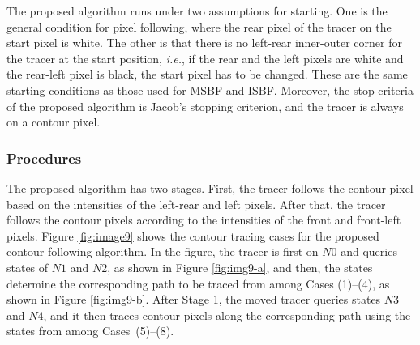 \documentclass[sensors,article,accept,moreauthors,pdftex,10pt,a4paper]{mdpi}
\begin{document}
The proposed algorithm runs under two assumptions for starting. One is the general condition for pixel following, where the rear pixel of the tracer on the start pixel is white. The other is that there is no left-rear inner-outer corner for the tracer at the start position, \emph{i.e.}, if the rear and the left pixels are white and the rear-left pixel is black, the start pixel has to be changed. These are the same starting conditions as those used for MSBF and ISBF. Moreover, the stop criteria of the proposed algorithm is Jacob's stopping criterion, and the tracer is always on a contour pixel. 




\subsubsection{Procedures}


The proposed algorithm has two stages. First, the tracer follows the contour pixel based on the intensities of the left-rear and left pixels. After that, the tracer follows the contour pixels according to the intensities of the front and front-left pixels. Figure \ref{fig:image9} shows the contour tracing cases for the proposed contour-following algorithm. In the figure, the tracer is first on $N0$ and queries states of $N1$ and $N2$, as shown in Figure \ref{fig:img9-a}, and then, the states determine the corresponding path to be traced from among Cases (1)--(4), as shown in Figure \ref{fig:img9-b}. After Stage 1, the moved tracer queries states $N3$ and $N4$, and it then traces contour pixels along the corresponding path using the states from among Cases~(5)--(8). 
\end{document}

